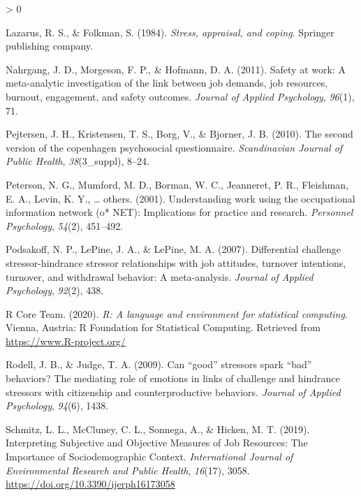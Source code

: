 \documentclass[
  english,
  man]{apa6}
\newlength{\cslhangindent}
\newenvironment{CSLReferences}[2] %
 {%
  \setlength{\parindent}{0pt}
  \ifodd #1 \everypar{\setlength{\hangindent}{\cslhangindent}}\ignorespaces\fi
  \ifnum #2 > 0
  \setlength{\parskip}{#2\baselineskip}
  \fi
 }%
 {}
\begin{document}
\begin{CSLReferences}{1}{0}
\leavevmode\hypertarget{ref-lazarus1984stress}{}%
Lazarus, R. S., \& Folkman, S. (1984). \emph{Stress, appraisal, and coping}. Springer publishing company.

\leavevmode\hypertarget{ref-nahrgang2011safety}{}%
Nahrgang, J. D., Morgeson, F. P., \& Hofmann, D. A. (2011). Safety at work: A meta-analytic investigation of the link between job demands, job resources, burnout, engagement, and safety outcomes. \emph{Journal of Applied Psychology}, \emph{96}(1), 71.

\leavevmode\hypertarget{ref-pejtersen2010second}{}%
Pejtersen, J. H., Kristensen, T. S., Borg, V., \& Bjorner, J. B. (2010). The second version of the copenhagen psychosocial questionnaire. \emph{Scandinavian Journal of Public Health}, \emph{38}(3\_suppl), 8--24.

\leavevmode\hypertarget{ref-peterson2001understanding}{}%
Peterson, N. G., Mumford, M. D., Borman, W. C., Jeanneret, P. R., Fleishman, E. A., Levin, K. Y., \ldots{} others. (2001). Understanding work using the occupational information network (o* NET): Implications for practice and research. \emph{Personnel Psychology}, \emph{54}(2), 451--492.

\leavevmode\hypertarget{ref-podsakoff2007differential}{}%
Podsakoff, N. P., LePine, J. A., \& LePine, M. A. (2007). Differential challenge stressor-hindrance stressor relationships with job attitudes, turnover intentions, turnover, and withdrawal behavior: A meta-analysis. \emph{Journal of Applied Psychology}, \emph{92}(2), 438.

\leavevmode\hypertarget{ref-R-base}{}%
R Core Team. (2020). \emph{R: A language and environment for statistical computing}. Vienna, Austria: R Foundation for Statistical Computing. Retrieved from \url{https://www.R-project.org/}

\leavevmode\hypertarget{ref-rodell2009can}{}%
Rodell, J. B., \& Judge, T. A. (2009). Can {``good''} stressors spark {``bad''} behaviors? The mediating role of emotions in links of challenge and hindrance stressors with citizenship and counterproductive behaviors. \emph{Journal of Applied Psychology}, \emph{94}(6), 1438.

\leavevmode\hypertarget{ref-schmitz_interpreting_2019}{}%
Schmitz, L. L., McCluney, C. L., Sonnega, A., \& Hicken, M. T. (2019). Interpreting {Subjective} and {Objective} {Measures} of {Job} {Resources}: {The} {Importance} of {Sociodemographic} {Context}. \emph{International Journal of Environmental Research and Public Health}, \emph{16}(17), 3058. \url{https://doi.org/10.3390/ijerph16173058}


\end{CSLReferences}
\end{document}
